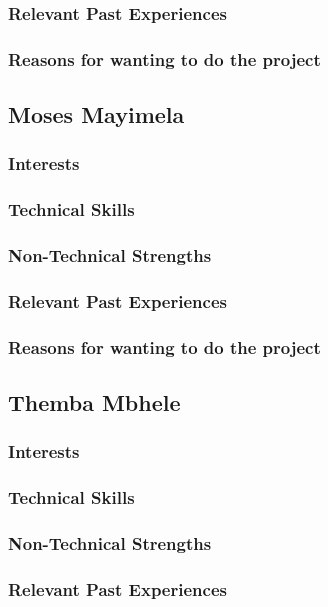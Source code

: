 \documentclass[a4paper,12pt]{article}
\begin{document}
\subsubsection{Relevant Past Experiences}
\subsubsection{Reasons for wanting to do the project}
\subsection{Moses Mayimela}
\subsubsection{Interests}
\subsubsection{Technical Skills}
\subsubsection{Non-Technical Strengths}
\subsubsection{Relevant Past Experiences}
\subsubsection{Reasons for wanting to do the project}
\subsection{Themba Mbhele}
\subsubsection{Interests}
\subsubsection{Technical Skills}
\subsubsection{Non-Technical Strengths}
\subsubsection{Relevant Past Experiences}
\end{document}
